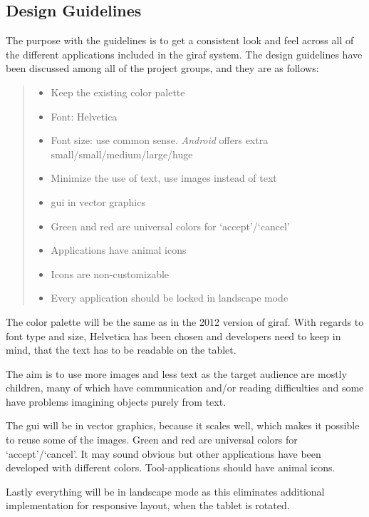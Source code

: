 \subsection{Design Guidelines}
\label{sub:designGuidelines}
The purpose with the guidelines is to get a consistent look and feel across all of the different applications included in the \ac{giraf} system.
The design guidelines have been discussed among all of the project groups, and they are as follows:

\begin{quote}
\begin{itemize}
\item Keep the existing color palette
\item Font: Helvetica
\item Font size: use common sense. \emph{Android} offers extra small/small/medium/large/huge
\item Minimize the use of text, use images instead of text
\item \ac{gui} in vector graphics
\item Green and red are universal colors for `accept'/`cancel'
\item Applications have animal icons
\item Icons are non-customizable
\item Every application should be locked in landscape mode
\end{itemize}
\end{quote}

The color palette will be the same as in the 2012 version of \ac{giraf}. With regards to font type and size, Helvetica has been chosen and developers need to keep in mind, that the text has to be readable on the tablet.

The aim is to use more images and less text as the target audience are mostly children, many of which have communication and/or reading difficulties and some have problems imagining objects purely from text.

The \ac{gui} will be in vector graphics, because it scales well, which makes it possible to reuse some of the images. Green and red are universal colors for `accept'/`cancel'. It may sound obvious but other applications have been developed with different colors.
Tool-applications should have animal icons.

Lastly everything will be in landscape mode as this eliminates additional implementation for responsive layout, when the tablet is rotated.
